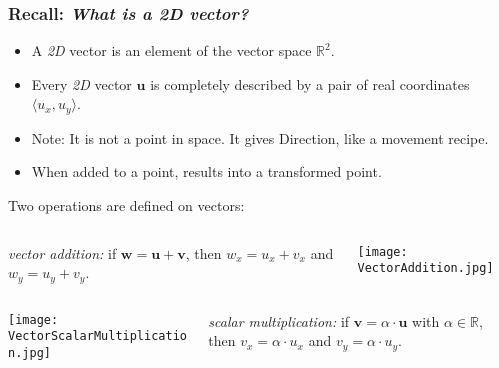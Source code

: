 \begin{frame}[fragile]\frametitle{Recall: \emph{What is a 2D vector?}}

\begin{itemize}
\item A \emph{2D} vector is an element of the vector space $\mathbb{R}^2$.
\item Every \emph{2D} vector $\mathbf{u}$ is completely described by a
  pair of real coordinates $\langle u_x, u_y \rangle$.
\item Note: It is not a point in space. It gives Direction, like a movement recipe. 
\item When added to a point, results into a transformed point.
\end{itemize}
  
  
  
  Two operations are defined on vectors:

  
  \begin{columns}
    \begin{column}{0.6\linewidth}
      \raggedleft
      \emph{vector addition:} if $\mathbf{w} = \mathbf{u} +
        \mathbf{v}$, then $w_x = u_x + v_x$ and $w_y = u_y + v_y$.
    \end{column}
    \begin{column}{0.4\linewidth}
      \centering
      \texttt{[image: VectorAddition.jpg]}
    \end{column}
  \end{columns}

  
  \begin{columns}
    \begin{column}{0.4\linewidth}
      \centering
      \texttt{[image: VectorScalarMultiplication.jpg]}
    \end{column}
    \begin{column}{0.6\linewidth}
      \raggedright
      \emph{scalar multiplication:} if $\mathbf{v} = \alpha
      \cdot \mathbf{u}$ with $\alpha \in \mathbb{R}$, then $v_x =
      \alpha \cdot u_x$ and $v_y = \alpha \cdot u_y$.
    \end{column}
  \end{columns}

\end{frame}

